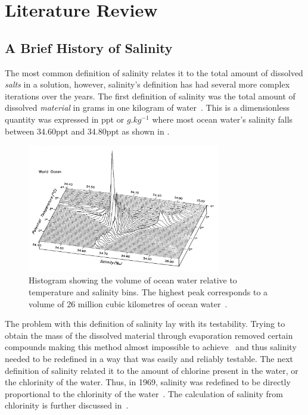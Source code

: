 
\chapter{Literature Review}\label{ch:literature}

\section{A Brief History of Salinity}\label{sec:a-brief-history-of-salinity}
The most common definition of salinity relates it to the total amount of dissolved \textit{salts} in a solution, however, salinity's definition has had several more complex iterations over the years.
The first definition of salinity was the total amount of dissolved \textit{material} in grams in one kilogram of water~\cite{stewart_introduction_to_physical_oceanography_2004}.
This is a dimensionless quantity was expressed in \gls{ppt} or $g.kg^{-1}$ where most ocean water's salinity falls between 34.60\gls{ppt} and 34.80\gls{ppt} as shown in .
\begin{figure}[h]
    \centering
    \includegraphics[width=0.75\textwidth]{Figures/ocean_salinity_temperature_quantity}
    \caption{Histogram showing the volume of ocean water relative to temperature and salinity bins. The highest peak corresponds to a volume of 26 million cubic kilometres of ocean water~\cite{worthington_ocean_graphs_1981}.}
    \label{fig:ocean_salinity_temperature_quantity} %
\end{figure}
The problem with this definition of salinity lay with its testability.
Trying to obtain the mass of the dissolved material through evaporation removed certain compounds making this method almost impossible to achieve~\cite{sverdrup_ocean_physics_and_chemistry_1942} and thus salinity needed to be redefined in a way that was easily and reliably testable.
The next definition of salinity related it to the amount of chlorine present in the water, or the chlorinity of the water.
Thus, in 1969, salinity was redefined to be directly proportional to the chlorinity of the water~\cite{stewart_introduction_to_physical_oceanography_2004}.
The calculation of salinity from chlorinity is further discussed in~.


